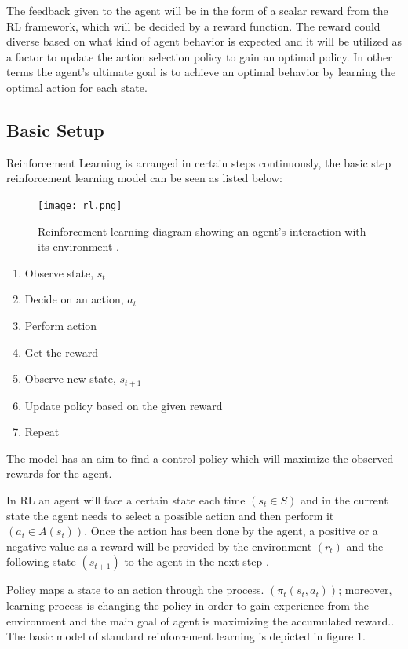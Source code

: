 \documentclass[12pt,twoside]{article}
\theoremstyle{plain}
\theoremstyle{definition}
\theoremstyle{remark}
\begin{document}
The feedback given to the agent will be in the form of a scalar reward from the RL framework, which will be decided by a reward function. The reward could diverse based on what kind of agent behavior is expected and it will be utilized as a factor to update the action selection policy to gain an optimal policy. In other terms the agent’s ultimate goal is to achieve an optimal behavior by learning the optimal action for each state.

\subsection{Basic Setup}


Reinforcement Learning is arranged in certain steps continuously, the basic step reinforcement learning model can be seen as listed below:


\begin{figure}
  \begin{center}
    \texttt{[image: rl.png]}
  \end{center}
  \caption{Reinforcement learning diagram showing an agent's interaction with its environment \cite{Sutton1998introduction}.}
  \label{rl}
\end{figure}

\begin{enumerate}
	\item Observe state, $s_t$
	\item Decide on an action, $a_t$
	\item Perform action
	\item Get the reward	
	\item Observe new state, $s_{t+1}$
	\item Update policy based on the given reward
	\item Repeat
\end{enumerate}
The model has an aim to find a control policy which will maximize the observed rewards for the agent.

In RL an agent will face a certain state each time $(s_t \in S)$ and in the current state the agent needs to select a possible action and then perform it $(a_t \in A(s_t))$. Once the action has been done by the agent, a positive or a negative value as a reward will be provided by the environment $(r_t)$ and the following state $(s_{t+1})$ to the agent in the next step \cite{Sutton1998introduction}.

Policy maps a state to an action through the process. $(\pi_t(s_t, a_t))$; moreover, learning process is changing the policy in order to gain experience from the environment and the main goal of agent is maximizing the accumulated reward.\cite{Sutton1998introduction}.
The basic model of standard reinforcement learning is depicted in figure 1.
\end{document}
